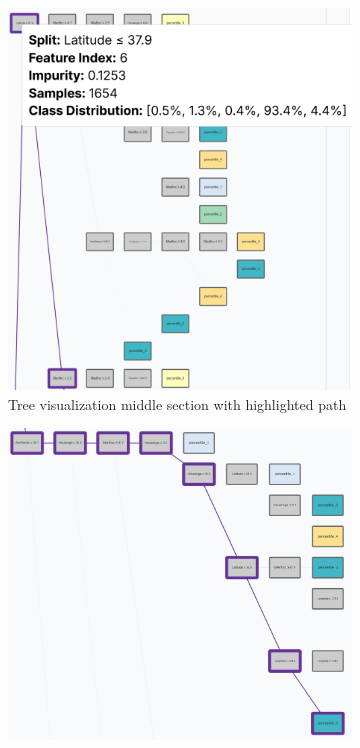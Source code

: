 \begin{figure}[p]
    \vspace{0.5cm}
    
    \begin{subfigure}[c]{0.48\textwidth}
        \centering
        \includegraphics[width=\textwidth,height=0.4\textheight,keepaspectratio]{images/ds_interaction_p3_highlight_tree_mid.png}
        \caption{Tree visualization middle section with highlighted path}
        \label{fig:ds_interaction_p3_highlight_tree_mid}
    \end{subfigure}
    \hfill
    \begin{subfigure}[c]{0.48\textwidth}
        \centering
        \includegraphics[width=\textwidth,height=0.4\textheight,keepaspectratio]{images/ds_interaction_p3_highlight_tree_bottom.png}

\end{subfigure}
\end{figure}
